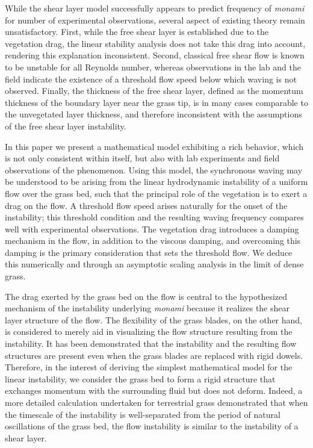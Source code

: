 \documentclass[aps,prl,reprint,twocolumn,showpacs,superscriptaddress,10pt]{revtex4-1}  %
\newcommand{\monami}{\textit{monami }}
\begin{document}
While the shear layer model successfully appears to predict frequency of \monami for number of experimental observations, several aspect of existing theory remain unsatisfactory. 
First, while the free shear layer is established due to the vegetation drag, the linear stability analysis\cite{Raupach96} does not take this drag into account, rendering this explanation inconsistent. 
Second, classical free shear flow is known to be unstable for all Reynolds number\cite{drazin}, whereas observations in the lab\cite{Ghisal02} and the field\cite{Grizzle96} indicate the existence of a threshold 
flow speed below which waving is not observed. 
Finally, the thickness of the free shear layer, defined as the momentum thickness of the boundary layer near the grass tip, is in many cases comparable to the unvegetated layer thickness,
and therefore inconsistent with the assumptions of the free shear layer instability. 

In this paper we present a mathematical model exhibiting a rich behavior, which is not only consistent within itself, but also with lab experiments and field observations of the phenomenon.
Using this model, the synchronous waving may be understood to be arising from the linear hydrodynamic instability of a uniform flow over the grass bed, such that the principal role of the vegetation is to exert a drag on the flow. 
A threshold flow speed arises naturally for the onset of the instability; this threshold condition and the resulting waving frequency compares well with experimental observations.
The vegetation drag introduces a damping mechanism in the flow, in addition to the viscous damping, and overcoming this damping is the primary consideration that sets the threshold flow.
We deduce this numerically and through an asymptotic scaling analysis in the limit of dense grass.

The drag exerted by the grass bed on the flow is central to the hypothesized mechanism\cite{Ghisal02} of the instability underlying \monami because it realizes the shear layer structure of the flow. 
The flexibility of the grass blades, on the other hand, is considered to merely aid in visualizing the flow structure resulting from the instability\cite{Nepf2012}. 
It has been demonstrated that the instability and the resulting flow structures are present even when the grass blades are replaced with rigid dowels\cite{Ghisal02}. 
Therefore, in the interest of deriving the simplest mathematical model for the linear instability, we consider the grass bed to form a rigid structure that exchanges momentum with the surrounding fluid but does not deform. 
Indeed, a more detailed calculation undertaken for terrestrial grass demonstrated\cite{Delangre06} that when the timescale of the instability is well-separated from the period of natural oscillations of the grass bed, 
the flow instability is similar to the instability of a shear layer. 
\end{document}
